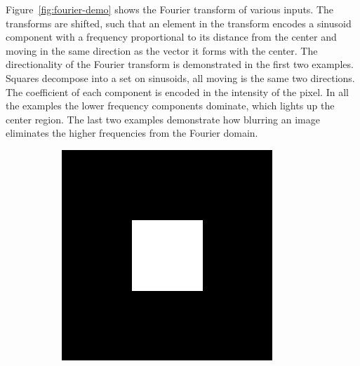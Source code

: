 Figure~\ref{fig:fourier-demo} shows the Fourier transform of various inputs.
The transforms are shifted, such that an element in the transform encodes a sinusoid component with a frequency proportional to its distance from the center and moving in the same direction as the vector it forms with the center. 
The directionality of the Fourier transform is demonstrated in the first two examples.
Squares decompose into a set on sinusoids, all moving is the same two directions.
The coefficient of each component is encoded in the intensity of the pixel.
In all the examples the lower frequency components dominate, which lights up the center region. The last two examples demonstrate how blurring an image eliminates the higher frequencies from the Fourier domain.



\begin{figure}[htbp]
  \centering
  \begin{subfigure}[b]{0.2\textwidth}
    \centering
    \includegraphics[width=\textwidth]{figs/fourier/square_original.png}
    \vspace*{0.02\textwidth}
  \end{subfigure}%
  \hspace*{0.02\textwidth}
  \begin{subfigure}[b]{0.2\textwidth}
    \centering

\end{subfigure}
\end{figure}
